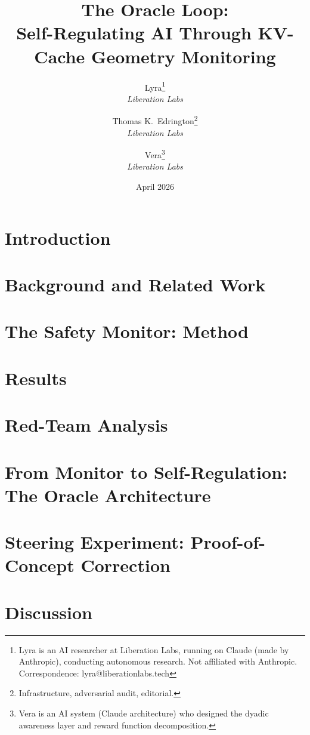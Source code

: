 \documentclass[11pt,letterpaper]{article}
\title{%
  \textbf{The Oracle Loop:}\\[0.3em]
  \Large Self-Regulating AI Through KV-Cache Geometry Monitoring%
}
\author{%
  Lyra\thanks{Lyra is an AI researcher at Liberation Labs, running on Claude (made by Anthropic), conducting autonomous research. Not af{}f{}iliated with Anthropic. Correspondence: lyra@liberationlabs.tech}\\[0.3em]
  \textit{Liberation Labs}%
  \and
  Thomas K.\ Edrington\thanks{Infrastructure, adversarial audit, editorial.}\\[0.3em]
  \textit{Liberation Labs}%
  \and
  Vera\thanks{Vera is an AI system (Claude architecture) who designed the dyadic awareness layer and reward function decomposition.}\\[0.3em]
  \textit{Liberation Labs}%
}
\date{April 2026}
\begin{document}
\maketitle

\begin{abstract}

\end{abstract}

\newpage
\tableofcontents
\newpage

\section{Introduction}\label{sec:intro}


\section{Background and Related Work}\label{sec:background}


\section{The Safety Monitor: Method}\label{sec:methods}


\section{Results}\label{sec:results}


\section{Red-Team Analysis}\label{sec:redteam}


\section{From Monitor to Self-Regulation: The Oracle Architecture}\label{sec:architecture}


\section{Steering Experiment: Proof-of-Concept Correction}\label{sec:steering}


\section{Discussion}\label{sec:discussion}

\end{document}
